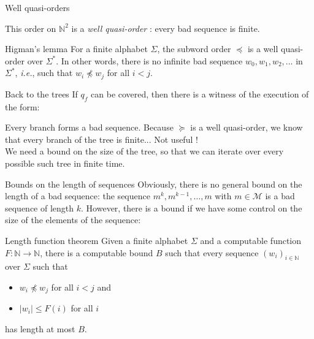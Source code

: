 \documentclass{beamer}
\newcommand{\messages}{\mathcal{M}}
\begin{document}
\begin{frame}{Well quasi-orders}
		 
		
		
		
		
		This order on $\mathbb{N}^2$ is a \emph{well quasi-order} : every bad sequence is finite.

			\begin{block}{Higman's lemma}
		For a finite alphabet $\Sigma$, the subword order $\preceq$ is a well quasi-order over $\Sigma^*$. In other words, there is no infinite bad sequence $w_0, w_1, w_2, \ldots$ in $\Sigma^*$, \emph{i.e.}, such that $w_i \npreceq w_j$ for all $i<j$.
	\end{block}
\end{frame}

\begin{frame}{Back to the trees}
If $q_f$ can be covered, then there is a witness of the execution of the form:
\begin{center}
\resizebox{!}{4cm}{

}
\end{center}

Every branch forms a bad sequence. Because $\succeq$ is a well quasi-order, we know that every branch of the tree is finite... 
\pause Not useful ! \\ We need a bound on the size of the tree, so that we can iterate over every possible such tree in finite time. 
\end{frame}

\begin{frame}{Bounds on the length of sequences}
	Obviously, there is no general bound on the length of a bad sequence: the sequence $m^k, m^{k-1}, \dots, m$ with $m \in \messages$ is a bad sequence of length $k$.  
	\pause
	However, there is a bound if we have some control on the size of the elements of the sequence:

	\begin{block}{Length function theorem\footnotemark}
	Given a finite alphabet $\Sigma$ and a computable function $F : \mathbb{N} \to \mathbb{N}$, there is a computable bound $B$ such that every sequence $(w_i)_{i \in \mathbb{N}}$ over $\Sigma$ such that
	\begin{itemize}
		\item $w_i \npreceq w_j$ for all $i<j$ and
		\item $|w_i| \leq F(i)$ for all $i$
	\end{itemize}
has length at most $B$.
\end{block}
\end{frame}
\end{document}
